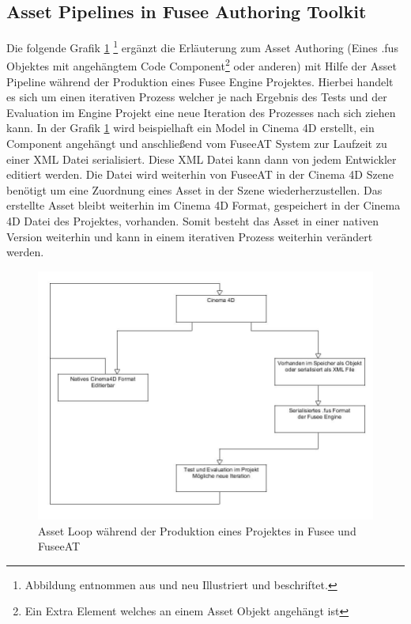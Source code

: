 \documentclass[pagesize, paper=a4, fontsize=12pt, titlepage=true, headings=small, headnosepline, abstractoff, liststotoc, nochapterprefix, plainheadsepline, twoside]{scrreprt}
\begin{document}
\subsection{Asset Pipelines in Fusee Authoring Toolkit}
Die folgende Grafik \ref{FuseeATAssetIteration} \footnote{Abbildung entnommen aus \cite[S. 7]{Carter2004} und neu Illustriert und beschriftet.} ergänzt die Erläuterung zum Asset Authoring (Eines .fus Objektes mit angehängtem Code Component\footnote{Ein Extra Element welches an einem Asset Objekt angehängt ist} oder anderen) mit Hilfe der Asset Pipeline während der Produktion eines Fusee Engine Projektes. Hierbei handelt es sich um einen iterativen Prozess welcher je nach Ergebnis des Tests und der Evaluation im Engine Projekt eine neue Iteration des Prozesses nach sich ziehen kann. In der Grafik \ref{FuseeATAssetIteration} wird beispielhaft ein Model in Cinema 4D erstellt, ein Component angehängt und anschließend vom FuseeAT System zur Laufzeit zu einer XML Datei serialisiert. Diese XML Datei kann dann von jedem Entwickler editiert werden. Die Datei wird weiterhin von FuseeAT in der Cinema 4D Szene benötigt um eine Zuordnung eines Asset in der Szene wiederherzustellen.
Das erstellte Asset bleibt weiterhin im Cinema 4D Format, gespeichert in der Cinema 4D Datei des Projektes, vorhanden. Somit besteht das Asset in einer nativen Version weiterhin und kann in einem iterativen Prozess weiterhin verändert werden.

\begin{figure}[ht]
	\centering
  \includegraphics[width=\linewidth]{Bilder/FuseeATAssetPipeline.jpg}
	\caption{Asset Loop während der Produktion eines Projektes in Fusee und FuseeAT}
	\label{FuseeATAssetIteration}
\end{figure}
\end{document}
